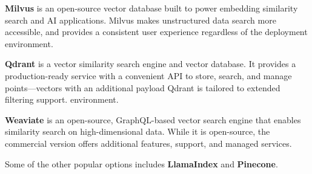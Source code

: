 \documentclass[conference]{IEEEtran}
\begin{document}
\textbf{Milvus} \cite{milvus} is an open-source vector database built to power embedding similarity search and AI applications. Milvus makes unstructured data search more accessible, and provides a consistent user experience regardless of the deployment environment.

\textbf{Qdrant} \cite{qdrant} is a vector similarity search engine and vector database. It provides a production-ready service with a convenient API to store, search, and manage points—vectors with an additional payload Qdrant is tailored to extended filtering support. environment.


\textbf{Weaviate} \cite{weaviate} is an open-source, GraphQL-based vector search engine that enables similarity search on high-dimensional data. While it is open-source, the commercial version offers additional features, support, and managed services.

Some of the other popular options includes \textbf{LlamaIndex} \cite{llama-index} and \textbf{Pinecone}.




\end{document}

